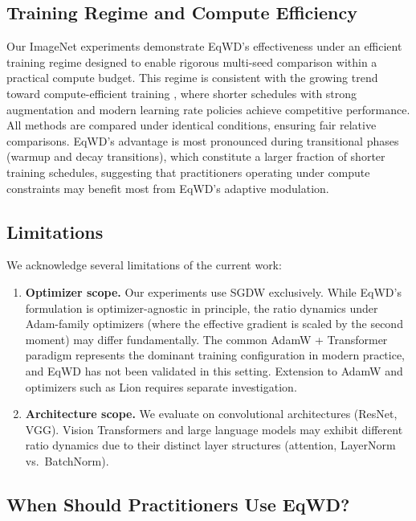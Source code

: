 \documentclass{article}
\begin{document}
\subsection{Training Regime and Compute Efficiency}
\label{sec:training_regime}

Our ImageNet experiments demonstrate EqWD's effectiveness under an
efficient training regime designed to enable rigorous multi-seed
comparison within a practical compute budget. This regime is consistent
with the growing trend toward compute-efficient training
\citep{he2019bag}, where shorter schedules with strong augmentation and
modern learning rate policies achieve competitive performance. All
methods are compared under identical conditions, ensuring fair relative
comparisons. EqWD's advantage is most pronounced during transitional
phases (warmup and decay transitions), which constitute a larger
fraction of shorter training schedules, suggesting that practitioners
operating under compute constraints may benefit most from EqWD's
adaptive modulation.

\subsection{Limitations}
\label{sec:limitations}

We acknowledge several limitations of the current work:

\begin{enumerate}
\item
  \textbf{Optimizer scope.} Our experiments use SGDW exclusively. While
  EqWD's formulation is optimizer-agnostic in principle, the ratio
  dynamics under Adam-family optimizers (where the effective gradient is
  scaled by the second moment) may differ fundamentally. The common
  AdamW + Transformer paradigm
  \citep{loshchilov2019adamw, dosovitskiy2021vit} represents the dominant
  training configuration in modern practice, and EqWD has not been
  validated in this setting. Extension to AdamW and optimizers such as
  Lion \citep{chen2023lion} requires separate investigation.
\item
  \textbf{Architecture scope.} We evaluate on convolutional
  architectures (ResNet, VGG). Vision Transformers and large language
  models may exhibit different ratio dynamics due to their distinct
  layer structures (attention, LayerNorm vs.~BatchNorm).
\end{enumerate}

\subsection{When Should Practitioners Use EqWD?}
\label{sec:practitioners}
\end{document}
